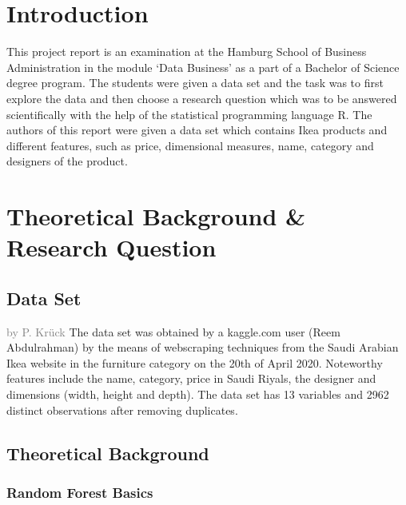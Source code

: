 \documentclass[a4paper, nobind]{templates/ociamthesis}
\begin{document}
\flushbottom

\hypertarget{intro}{%
\chapter{Introduction}\label{intro}}

This project report is an examination at the Hamburg School of Business Administration in the module `Data Business' as a part of a Bachelor of Science degree program. The students were given a data set and the task was to first explore the data and then choose a research question which was to be answered scientifically with the help of the statistical programming language R. The authors of this report were given a data set which contains Ikea products and different features, such as price, dimensional measures, name, category and designers of the product.

\hypertarget{theoretical-background-research-question}{%
\chapter{Theoretical Background \& Research Question}\label{theoretical-background-research-question}}

\hypertarget{data-set}{%
\section{Data Set}\label{data-set}}

\textcolor{gray}{by P. Krück}
The data set was obtained by a kaggle.com user (Reem Abdulrahman) by the means of webscraping techniques from the Saudi Arabian Ikea website in the furniture category on the 20th of April 2020. Noteworthy features include the name, category, price in Saudi Riyals, the designer and dimensions (width, height and depth). The data set has 13 variables and 2962 distinct observations after removing duplicates.

\hypertarget{theoretical_background}{%
\section{Theoretical Background}\label{theoretical_background}}

\hypertarget{random-forest-basics}{%
\subsection{Random Forest Basics}\label{random-forest-basics}}
\end{document}
